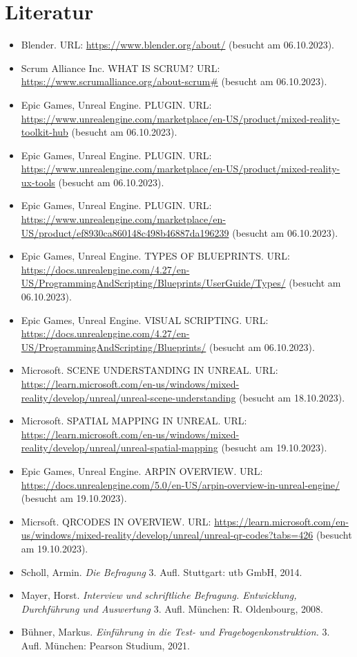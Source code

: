 \chapter{Literatur}

\begin{itemize}
    \item Blender. URL: \url{https://www.blender.org/about/} (besucht am 06.10.2023).
    \item Scrum Alliance Inc. WHAT IS SCRUM? URL: \url{https://www.scrumalliance.org/about-scrum#} (besucht am 06.10.2023).
    \item Epic Games, Unreal Engine. PLUGIN. URL: \url{https://www.unrealengine.com/marketplace/en-US/product/mixed-reality-toolkit-hub} (besucht am 06.10.2023).
    \item Epic Games, Unreal Engine. PLUGIN. URL: \url{https://www.unrealengine.com/marketplace/en-US/product/mixed-reality-ux-tools} (besucht am 06.10.2023).
    \item Epic Games, Unreal Engine. PLUGIN. URL: \url{https://www.unrealengine.com/marketplace/en-US/product/ef8930ca860148c498b46887da196239} (besucht am 06.10.2023).
    \item Epic Games, Unreal Engine. TYPES OF BLUEPRINTS. URL: \url{https://docs.unrealengine.com/4.27/en-US/ProgrammingAndScripting/Blueprints/UserGuide/Types/} (besucht am 06.10.2023).
    \item Epic Games, Unreal Engine. VISUAL SCRIPTING. URL: \url{https://docs.unrealengine.com/4.27/en-US/ProgrammingAndScripting/Blueprints/} (besucht am 06.10.2023).
    \item Microsoft. SCENE UNDERSTANDING IN UNREAL. URL: \url{https://learn.microsoft.com/en-us/windows/mixed-reality/develop/unreal/unreal-scene-understanding} (besucht am 18.10.2023).
    \item Microsoft. SPATIAL MAPPING IN UNREAL. URL: \url{https://learn.microsoft.com/en-us/windows/mixed-reality/develop/unreal/unreal-spatial-mapping} (besucht am 19.10.2023).
    \item Epic Games, Unreal Engine. ARPIN OVERVIEW. URL: \url{https://docs.unrealengine.com/5.0/en-US/arpin-overview-in-unreal-engine/} (besucht am 19.10.2023).
    \item Micrsoft. QRCODES IN OVERVIEW. URL: \url{https://learn.microsoft.com/en-us/windows/mixed-reality/develop/unreal/unreal-qr-codes?tabs=426} (besucht am 19.10.2023).
    \item Scholl, Armin. \textit{Die Befragung} 3. Aufl. Stuttgart: utb GmbH, 2014.
    \item Mayer, Horst. \textit{Interview und schriftliche Befragung. Entwicklung, Durchführung und Auswertung} 3. Aufl. München: R. Oldenbourg, 2008.
    \item Bühner, Markus. \textit{Einführung in die Test- und Fragebogenkonstruktion.} 3. Aufl. München: Pearson Studium, 2021.
\end{itemize}


